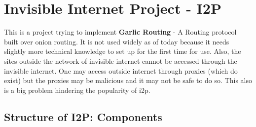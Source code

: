 \documentclass{main}
\begin{document}
\section{Invisible Internet Project - I2P}
This is a project trying to implement \textbf{Garlic Routing} - A Routing protocol built over onion routing.
It is not used widely as of today because it needs slightly more technical knowledge to set up for
the first time for use. Also, the sites outside the network of invisible internet cannot be accessed
through the invisible internet. One may access outside internet through proxies (which do exist) but 
the proxies may be malicious and it may not be safe to do so. This also is a big problem hindering the
popularity of i2p.

\subsection{Structure of I2P: Components}
\end{document}
